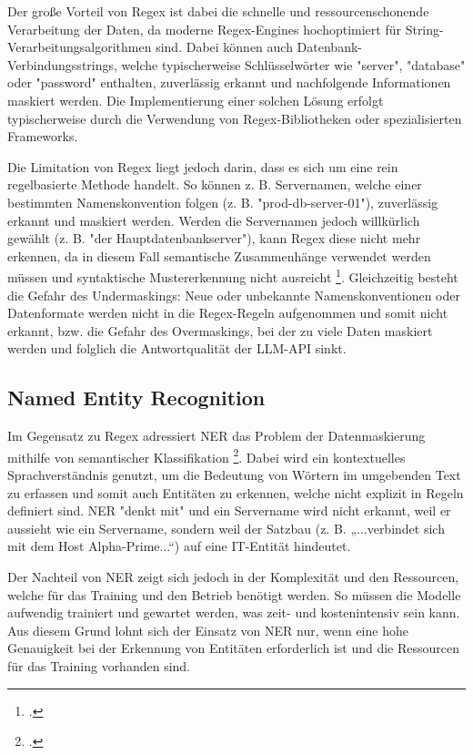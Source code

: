Der große Vorteil von \ac{Regex} ist dabei die schnelle und ressourcenschonende Verarbeitung der Daten, da moderne Regex-Engines hochoptimiert
für String-Verarbeitungsalgorithmen sind. Dabei können auch Datenbank-Verbindungsstrings, welche typischerweise Schlüsselwörter wie "server",
"database" oder "password" enthalten, zuverlässig erkannt und nachfolgende Informationen maskiert werden.
Die Implementierung einer solchen Lösung erfolgt typischerweise durch die Verwendung von \ac{Regex}-Bibliotheken oder spezialisierten Frameworks.

Die Limitation von \ac{Regex} liegt jedoch darin, dass es sich um eine rein regelbasierte Methode handelt.
So können z. B. Servernamen, welche einer bestimmten Namenskonvention folgen (z. B. "prod-db-server-01"), zuverlässig erkannt und maskiert werden.
Werden die Servernamen jedoch willkürlich gewählt (z. B. "der Hauptdatenbankserver"), kann \ac{Regex} diese nicht mehr erkennen,
da in diesem Fall semantische Zusammenhänge verwendet werden müssen und syntaktische Mustererkennung nicht ausreicht \footcite{srivastava2024recentadvances}.
Gleichzeitig besteht die Gefahr des Undermaskings: Neue oder unbekannte Namenskonventionen oder Datenformate
werden nicht in die \ac{Regex}-Regeln aufgenommen und somit nicht erkannt,
bzw. die Gefahr des Overmaskings, bei der zu viele Daten maskiert werden und folglich die Antwortqualität der \ac{LLM}-\ac{API} sinkt.


\subsection{Named Entity Recognition}
Im Gegensatz zu \ac{Regex} adressiert \ac{NER} das Problem der Datenmaskierung mithilfe von semantischer Klassifikation \footcite{srivastava2024recentadvances}.
Dabei wird ein kontextuelles Sprachverständnis genutzt, um die Bedeutung von Wörtern im umgebenden Text zu erfassen und somit auch
Entitäten zu erkennen, welche nicht explizit in Regeln definiert sind. \ac{NER} "denkt mit" und ein Servername wird nicht erkannt,
weil er aussieht wie ein Servername, sondern weil der Satzbau (z. B. „...verbindet sich mit dem Host Alpha-Prime...“) auf eine IT-Entität hindeutet.

Der Nachteil von \ac{NER} zeigt sich jedoch in der Komplexität und den Ressourcen, welche für das Training und den Betrieb benötigt werden.
So müssen die Modelle aufwendig trainiert und gewartet werden, was zeit- und kostenintensiv sein kann.
Aus diesem Grund lohnt sich der Einsatz von \ac{NER} nur, wenn eine hohe Genauigkeit bei der Erkennung von
Entitäten erforderlich ist und die Ressourcen für das Training vorhanden sind.


